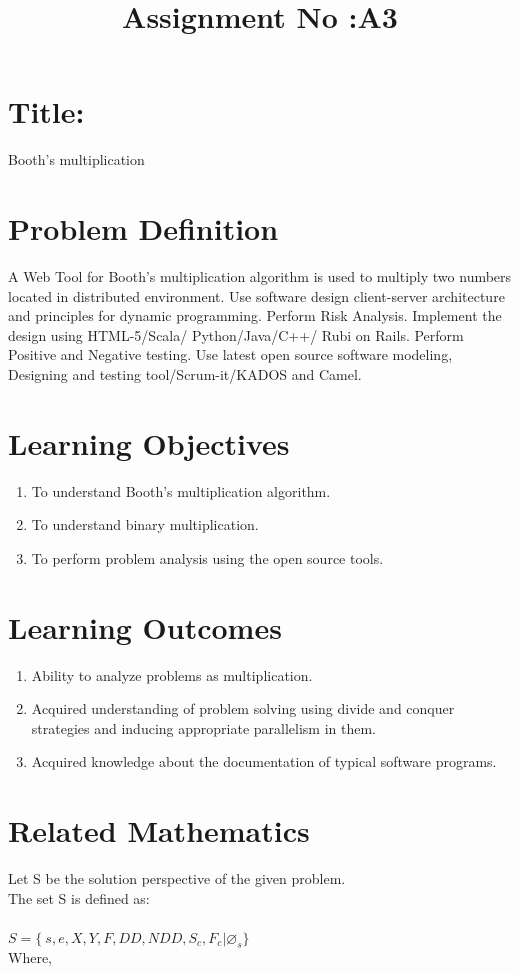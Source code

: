 \documentclass[10pt,a4paper]{article}
\title{Assignment No :A3}
\date{}
\begin{document}
\maketitle
\section{Title:}
Booth's multiplication

\section{Problem Definition}
A Web Tool for Booth's multiplication algorithm is used to multiply two numbers located in distributed
environment. Use software design client-server architecture and principles for dynamic programming.
Perform Risk Analysis. Implement the design using HTML-5/Scala/ Python/Java/C++/ Rubi on Rails.
Perform Positive and Negative testing. Use latest open source software modeling, Designing and testing
tool/Scrum-it/KADOS and Camel.

\section{Learning Objectives}
\begin{enumerate}
\item To understand Booth's multiplication algorithm.
\item To understand binary multiplication.
\item To perform problem analysis using the open source tools.
\end{enumerate}

\section{Learning Outcomes}
\begin{enumerate}
\item Ability to analyze problems as multiplication.
\item Acquired understanding of problem solving using divide and conquer strategies and inducing appropriate parallelism in them.
\item Acquired knowledge about the documentation of typical software programs.
\end{enumerate}


\section{Related Mathematics}
Let S be the solution perspective of the given problem.\\
The set S is defined as:\\\\
$S=\lbrace\ s,e,X,Y,F,DD,NDD,S_{c},F_{c}|\varnothing_{s}\rbrace$ \\
Where,
\end{document}

